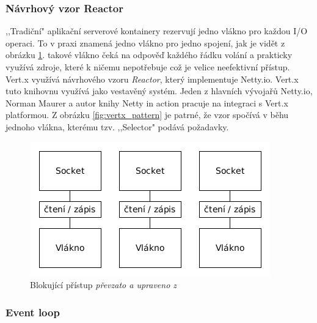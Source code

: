 \subsubsection{Návrhový vzor Reactor}

,,Tradiční" aplikační serverové kontainery rezervují jedno vlákno pro každou I/O operaci. To v praxi znamená jedno vlákno pro jedno spojení, jak je vidět z obrázku \ref{fig:blocking_pattern}. takové vlákno čeká na odpověď každého řádku volání a prakticky využívá zdroje, které k ničemu nepotřebuje což je velice neefektivní přístup. Vert.x využívá návrhového vzoru \emph{Reactor}, který implementuje Netty.io. Vert.x tuto knihovnu využívá jako vestavěný systém. Jeden z hlavních vývojařů Netty.io, Norman Maurer a autor knihy Netty in action\cite{nettyInAction} pracuje na integraci s Vert.x platformou. Z obrázku \ref{fig:vertx_pattern} je patrné, že vzor spočívá v běhu jednoho vlákna, kterému tzv. ,,Selector" podává požadavky.

\begin{figure}
\begin{centering}
\includegraphics[scale=0.55]{obrazky/blocking_pattern}
\par\end{centering}
\caption{Blokující přístup \emph{převzato a upraveno z \cite{nettyInAction}}\label{fig:blocking_pattern}}
\end{figure}

\subsubsection{Event loop}

